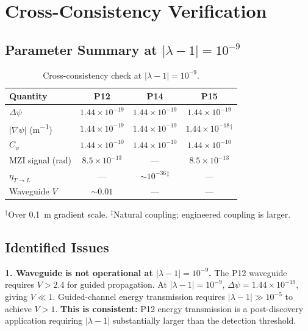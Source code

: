 \documentclass[aps,prd,twocolumn,superscriptaddress,nofootinbib]{revtex4-2}
\newcommand{\ee}[1]{\times 10^{#1}}
\begin{document}
\section{Cross-Consistency Verification}
\label{sec:cross-check}

\subsection{Parameter Summary at $|\lambda-1| = 10^{-9}$}

\begin{table}[h]
\centering
\caption{Cross-consistency check at $|\lambda-1| = 10^{-9}$.}
\label{tab:cross-check}
\begin{ruledtabular}
\begin{tabular}{lccc}
Quantity & P12 & P14 & P15 \\
\hline
$\Delta\psi$ & $1.44\ee{-19}$ & $1.44\ee{-19}$ & $1.44\ee{-19}$ \\
$|\nabla\psi|$ (\si{m^{-1}}) & $1.44\ee{-19}$ & $1.44\ee{-19}$ & $1.44\ee{-18}$$^\dagger$ \\
$C_\psi$ & $1.44\ee{-10}$ & $1.44\ee{-10}$ & $1.44\ee{-10}$ \\
MZI signal (rad) & $8.5\ee{-13}$ & --- & $8.5\ee{-13}$ \\
$\eta_{T\to L}$ & --- & $\sim 10^{-36}$$^\ddagger$ & --- \\
Waveguide $V$ & $\sim 0.01$ & --- & --- \\
\end{tabular}
\end{ruledtabular}
{\footnotesize $^\dagger$Over 0.1~m gradient scale.
$^\ddagger$Natural coupling; engineered coupling is larger.}
\end{table}

\subsection{Identified Issues}

\textbf{1. Waveguide is not operational at $|\lambda-1| = 10^{-9}$.}
The P12 waveguide requires $V > 2.4$ for guided propagation.
At $|\lambda-1| = 10^{-9}$, $\Delta\psi = 1.44\ee{-19}$,
giving $V \ll 1$.  Guided-channel energy transmission requires
$|\lambda-1| \gg 10^{-5}$ to achieve $V > 1$.  \textbf{This is
consistent:} P12 energy transmission is a post-discovery
application requiring $|\lambda-1|$ substantially larger
than the detection threshold.
\end{document}
